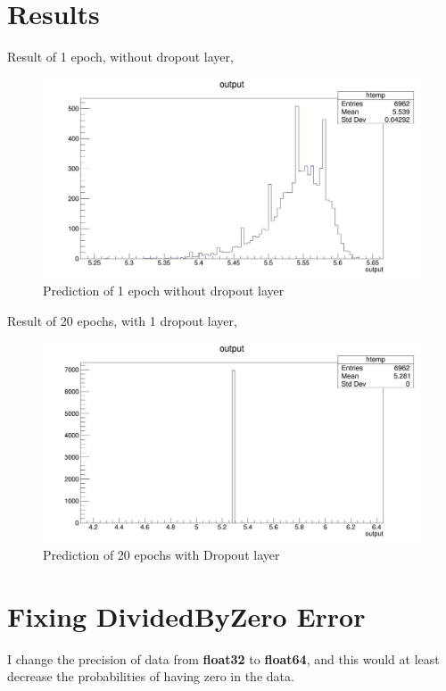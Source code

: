 \documentclass[12pt]{article}
\numberwithin{equation}{section}
\begin{document}
\section{Results}
Result of 1 epoch, without dropout layer,
\begin{figure}[H]
    \centering
    \includegraphics[width=0.75\linewidth]{figures/prediction.jpg}
    \caption{Prediction of 1 epoch without dropout layer}
    \label{}
\end{figure}
Result of 20 epochs, with 1 dropout layer,
\begin{figure}[H]
    \centering
    \includegraphics[width=0.75\linewidth]{figures/prediction20epochs.jpg}
    \caption{Prediction of 20 epochs with Dropout layer}
    \label{}
\end{figure}

\section{Fixing DividedByZero Error}
I change the precision of data from \textbf{float32} to \textbf{float64}, and this would at least decrease the probabilities of having zero in the data.
\end{document}
